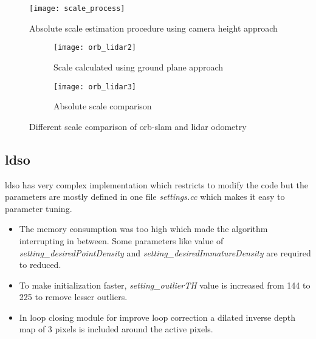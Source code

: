 \begin{figure}[H]
	\centering
	\texttt{[image: scale\_process]}
	\caption{Absolute scale estimation procedure using camera height approach \cite{ground}}
	\label{fig:scale_process}
\end{figure}
\begin{figure}[H]
	\begin{subfigure}{.5\textwidth}
		\centering
		\texttt{[image: orb\_lidar2]}
		\caption{Scale calculated using ground plane approach}
		\label{fig:orb_lidar2}
	\end{subfigure}%
	\begin{subfigure}{.5\textwidth}
		\centering
		\texttt{[image: orb\_lidar3]}
		\caption{Absolute scale comparison}
		\label{fig:orb_lidar3}
	\end{subfigure}
	\caption{Different scale comparison of \acrshort{orb}-\acrshort{slam} and \acrshort{lidar} odometry }
	\label{fig:plots}
\end{figure}

\subsection{\acrshort{ldso}}
\acrshort{ldso} has very complex implementation which restricts to modify the code but the parameters are mostly defined in one file \textit{settings.cc} which makes it easy to parameter tuning.
\begin{itemize} 
	\item The memory consumption was too high which made the algorithm interrupting in between. Some parameters like value of \textit{setting\_desiredPointDensity} and \textit{setting\_desiredImmatureDensity} are required to reduced.
 	\item To make initialization faster, \textit{setting\_outlierTH} value is increased from 144 to 225 to remove lesser outliers.
	\item In loop closing module for improve loop correction a dilated inverse depth map of 3 pixels is included around the active pixels. 
\end{itemize}
